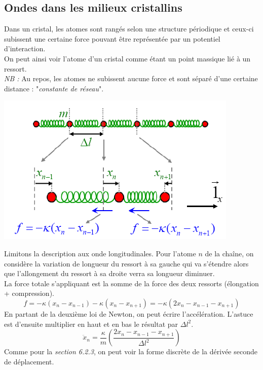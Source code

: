 \documentclass	[11pt, a4paper, openany]{book}
\begin{document}
\subsection{Ondes dans les milieux cristallins}
Dans un cristal, les atomes sont rangés selon une structure périodique et ceux-ci subissent une certaine force pouvant être représentée par un potentiel d'interaction.\\
On peut ainsi voir l'atome d'un cristal comme étant un point massique lié à un ressort.\\
\textit{NB :} Au repos, les atomes ne subissent aucune force et sont séparé d'une certaine distance : "\textit{constante de réseau}".
\begin{center}
\includegraphics[scale=0.4]{oo/image26.png}
\end{center}
Limitons la description aux onde longitudinales. Pour l'atome $n$ de la chaîne, on considère la variation de longueur du ressort à sa gauche qui va s'étendre alors que l'allongement du ressort à sa droite verra sa longueur diminuer. \\
La force totale s'appliquant est la somme de la force des deux ressorts (élongation + compression).
\begin{equation}
f = -\kappa(x_n - x_{n-1}) - \kappa(x_n - x_{n+1}) = -\kappa(2x_n - x_{n-1} - x_{n+1})
\end{equation}
En partant de la deuxième loi de Newton, on peut écrire l'accélération. L'astuce est d'ensuite multiplier en haut et en bas le résultat par $\Delta l^2$.
\begin{equation}
\ddot{x}_n = \frac{\kappa}{m}\left( \frac{2x_n - x_{n-1} - x_{n+1}}{\Delta l^2} \right)
\end{equation}
Comme pour la \textit{section 6.2.3}, on peut voir la forme discrète de la dérivée seconde de déplacement.
\end{document}

